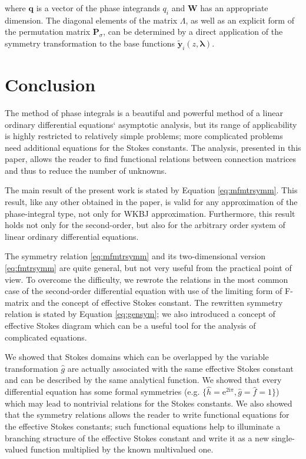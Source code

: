 \documentclass[atmp]{ipart_v1}
\def\rme{\mathrm{e}}
\def\rmi{\mathrm{i}}
\def\lmbd{\bm{\lambda}}
\def\f{\hat{f}}
\def\g{\hat{g}}
\def\h{\hat{h}}
\def\P{\bm{P}_\sigma}
\def\W{\bm{W}}
\def\unity{1}
\newcommand\eref[1]{\eqref{#1}}
\newcommand\Eref[1]{Equation \ref{#1}}
\begin{document}
where $\bm{q}$ is a vector of the phase integrands $q_i$ and $\W$ has an appropriate dimension.
The diagonal elements of the matrix $\bm{\mathit{\Lambda}}$, as well as an explicit form of the permutation matrix $\P$, can
be determined by a direct application of the symmetry transformation to the base functions $\bm{\tilde{y}}_i(z,\lmbd)$.















 

\section{Conclusion \label{sec:cnclsns}}

The method of phase integrals is a beautiful and powerful method of a linear ordinary 
differential equations` asymptotic analysis, but its range of applicability is highly 
restricted to relatively simple problems; more complicated problems need additional equations 
for the Stokes constants. The analysis, presented in this paper, allows the reader to find 
functional relations between connection matrices and thus to reduce the number of unknowns.

The main result of the present work is stated by \Eref{eq:mfmtrsymm}. This result, 
like any other obtained in the paper, is valid for any approximation of the 
phase-integral type, not only for WKBJ approximation. Furthermore, this result holds 
not only for the second-order, but also for the arbitrary order system of linear ordinary 
differential equations. 

The symmetry relation \eref{eq:mfmtrsymm} and its two-dimensional version \eref{eq:fmtrsymm} are quite general, 
but not very useful from the practical point of view. To overcome the difficulty, we rewrote the relations in the
most common case of the second-order differential equation with use of the limiting form of 
F-matrix and the concept of effective Stokes constant. The rewritten
symmetry relation is stated by \Eref{eq:gensym}; we also introduced a concept of effective Stokes diagram
which can be a useful tool for the analysis of complicated equations. 

We showed that Stokes domains which can be overlapped by the variable transformation $\g$ are actually 
associated with the same effective Stokes constant and can be described by the same analytical function. 
We showed that every differential equation has some formal symmetries (e.g. $\{\h=\rme^{2\rmi\pi},\g=\f=\unity\}$) 
which may lead to nontrivial relations for the Stokes constants. We also showed that the symmetry relations allows the 
reader to write functional equations for the effective Stokes constants; such functional equations
help to illuminate a branching structure of the effective Stokes constant and write it as a new single-valued 
function multiplied by the known multivalued one.
\end{document}
